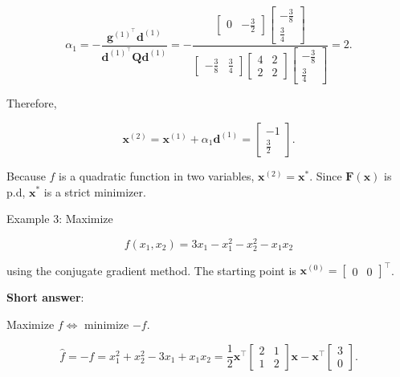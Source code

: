 \[
	\alpha_{1}=-\dfrac{\boldsymbol{g}^{(1)^{\top}} \boldsymbol{d}^{(1)}}{\boldsymbol{d}^{(1)^{\top}} \boldsymbol{Q} \boldsymbol{d}^{(1)}}=-\dfrac{\left[\begin{array}{ll}
			0 & -\frac{3}{2}
		\end{array}\right]\left[\begin{array}{c}
			-\frac{3}{8} \\
			\frac{3}{4}
		\end{array}\right]}{\left[\begin{array}{ll}
			-\frac{3}{8} & \frac{3}{4}
		\end{array}\right]\left[\begin{array}{ll}
			4 & 2 \\
			2 & 2
		\end{array}\right]\left[\begin{array}{c}
			-\frac{3}{8} \\
			\frac{3}{4}
		\end{array}\right]}=2 .
\]

Therefore,

\[
	\boldsymbol{x}^{(2)}=\boldsymbol{x}^{(1)}+\alpha_{1} \boldsymbol{d}^{(1)}=\left[\begin{array}{c}
		-1 \\
		\frac{3}{2}
	\end{array}\right] .
\]

Because \(f\) is a quadratic function in two variables, \(\boldsymbol{x}^{(2)}=\boldsymbol{x}^{*}\). Since \(\boldsymbol{F}(\boldsymbol{x})\) is p.d, \(\boldsymbol{x}^{*}\) is a strict minimizer.



Example 3: Maximize

\[
	f\left(x_{1}, x_{2}\right)=3 x_{1}-x_{1}^{2}-x_{2}^{2}-x_{1} x_{2}
\]

using the conjugate gradient method. The starting point is \(\boldsymbol{x}^{(0)}=\left[\begin{array}{ll}0 & 0\end{array}\right]^{\top}\).

\textbf{Short answer}:

Maximize \(f \Leftrightarrow\) minimize \(-f\).

\[
	\hat{f}=-f=x_{1}^{2}+x_{2}^{2}-3 x_{1}+x_{1} x_{2}=\frac{1}{2} \boldsymbol{x}^{\top}\left[\begin{array}{ll}
		2 & 1 \\
		1 & 2
	\end{array}\right] \boldsymbol{x}-\boldsymbol{x}^{\top}\left[\begin{array}{l}
		3 \\
		0
	\end{array}\right] .
\]

